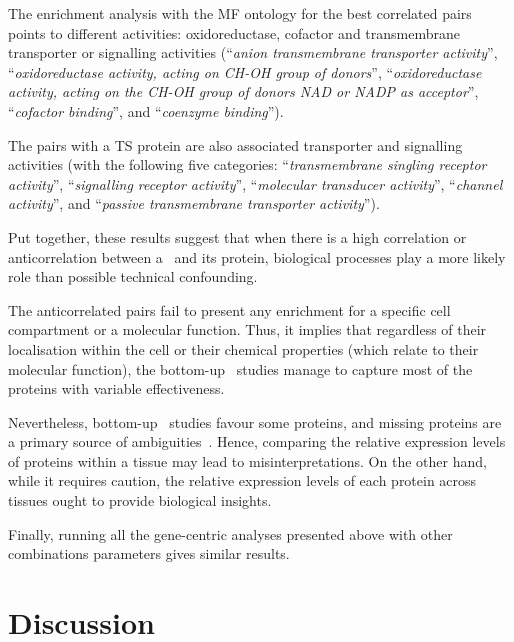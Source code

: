 The enrichment analysis with the MF ontology
for the best correlated pairs points to different activities:
oxidoreductase, cofactor and transmembrane transporter or signalling activities
(\enquote{\textit{anion transmembrane transporter activity}},
\enquote{\textit{oxidoreductase activity, acting on CH-OH group of donors}},
\enquote{\textit{oxidoreductase activity, acting on the CH-OH group of donors
NAD or NADP as acceptor}},
\enquote{\textit{cofactor binding}},
and \enquote{\textit{coenzyme binding}}).

The pairs with a \gls{TS} protein are also associated
transporter and signalling activities
(with the following five categories:
\enquote{\textit{transmembrane singling receptor activity}},
\enquote{\textit{signalling receptor activity}},
\enquote{\textit{molecular transducer activity}},
\enquote{\textit{channel activity}},
and \enquote{\textit{passive transmembrane transporter activity}}).

Put together, these results suggest that
when there is a high correlation or anticorrelation between a \mRNA\ and its protein,
biological processes play a more likely role than possible technical confounding.

The anticorrelated pairs fail to present any enrichment
for a specific cell compartment or a molecular function.
Thus, it implies that
regardless of their localisation within the cell
or their chemical properties (which relate to their molecular function),
the bottom-up \ms\ studies manage to capture most of the proteins
with variable effectiveness.

Nevertheless, bottom-up \ms\ studies favour some proteins,
and missing proteins are a primary source of ambiguities~.
Hence, comparing the relative expression levels of proteins within a tissue
may lead to misinterpretations.
On the other hand, while it requires caution,
the relative expression levels of each protein across tissues
ought to provide biological insights.

Finally, running all the gene-centric analyses presented above
with other combinations parameters gives similar results.

\section{Discussion}

